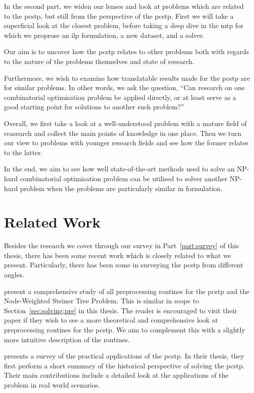 In the second part, we widen our lenses and look at problems which are related to the \gls{pcstp},
but still from the perspective of
the \gls{pcstp}.
First we will take a superficial look at the closest problem,
before taking a deep dive in the \acrlong{mtp} for which
we proprose an \gls{ilp} formulation, a new dataset, and a solver.

Our aim is to uncover how the \gls{pcstp} relates to other problems
both with regards to the nature of the problems themselves and state of
research.

Furthermore, we wish to examine how translatable results made for the \gls{pcstp} are for similar problems.
In other words, we ask the question,
``Can research on one combinatorial optimisation problem be applied directly, or at least
serve as a good starting point for solutions to another such problem?''

\medskip\noindent
Overall, we first take a look at a well-understood problem with a mature field of reasearch and collect
the main points of knowledge in one place. Then we turn our view to problems with younger research fields
and see how the former relates to the latter.

In the end, we aim to see how well state-of-the-art methods used to solve an NP-hard combinatorial
optimisation problem can be utilised to solver another NP-hard problem when the problems are particularly
similar in formulation.

\section{Related Work}
Besides the research we cover through our survey in
Part~\ref{part:survey} of this thesis,
there has been some recent work which is closely related
 to what we present. Particularly, there has been some in surveying the
\acrlong{pcstp} from different angles.

\citet*{rehfeldt2016reduction} present a comprehensive study of all preprocessing routines
for the \gls{pcstp} and the Node-Weighted Steiner Tree Problem. This is similar in scope to
Section~\ref{sec:solving:pre} in this thesis. The reader is encouraged to visit their paper
if they wish to see a more theoretical and comprehensive look at preprocessing routines for
the \gls{pcstp}. We aim to complement this with a slightly more intuitive description of the
routines.

\citet*{sun2018classical} presents a survey of the practical applications of the \gls{pcstp}.
In their thesis, they first perform a short summary of the historical perspective of
solving the \gls{pcstp}. Their main contributions include
a detailed look at the applications
of the problem in real world scenarios.

